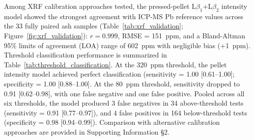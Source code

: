 \documentclass[
  journal=esthag,        %
  manuscript=article,    %
  layout=onecolumn       %
]{achemso}
\begin{document}
Among XRF calibration approaches tested, the pressed-pellet L$\beta_{1}$+L$\beta_{2}$ intensity model showed the strongest agreement with ICP-MS Pb reference values across the 33 fully paired ash samples (Table~\ref{tab:xrf_validation}; Figure~\ref{fig:xrf_validation}): $r = 0.999$, RMSE = 151~ppm, and a Bland-Altman 95\% limits of agreement (LOA) range of 602~ppm with negligible bias (+1~ppm). Threshold classification performance is summarized in Table~\ref{tab:threshold_classification}. At the 320~ppm threshold, the pellet intensity model achieved perfect classification (sensitivity = 1.00 [0.61--1.00]; specificity = 1.00 [0.88--1.00]. At the 80~ppm threshold, sensitivity dropped to 0.91 [0.62--0.98], with one false negative and one false positive. Pooled across all six thresholds, the model produced 3 false negatives in 34 above-threshold tests (sensitivity = 0.91 [0.77--0.97]), and 4 false positives in 164 below-threshold tests (specificity = 0.98 [0.94--0.99]). Comparison with alternative calibration approaches are provided in Supporting Information \S 2.
\end{document}
